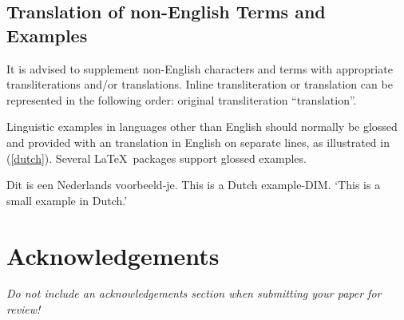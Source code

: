 \documentclass{clarin}
\begin{document}
{%
%
%
%



\subsection{Translation of non-English Terms and Examples}

It is advised to supplement non-English characters and terms
with appropriate transliterations and/or translations.
Inline transliteration or translation can be represented in
the following order: original transliteration ``translation''.

Linguistic examples in languages other than English should normally be glossed
and provided with an translation in English on separate lines, as illustrated in (\ref{dutch}).
Several \LaTeX\ packages support glossed examples.

\begin{examples}
\item \label{dutch}
\gll Dit is een Nederlands voorbeeld-je.
This is a Dutch example-DIM.
\glt `This is a small example in Dutch.'
\glend
\end{examples}


\section*{Acknowledgements}

\emph{Do not include an acknowledgements section when submitting your paper for review!}

}
\end{document}
